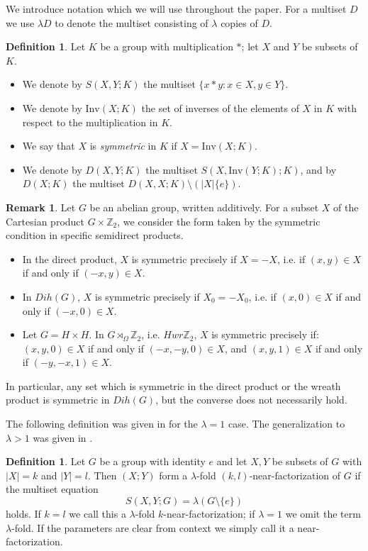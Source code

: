 \documentclass[12pt, a4paper]{article}
\theoremstyle{definition}
\newtheorem{definition}[theorem]{Definition}
\newtheorem{remark}[theorem]{Remark}
\begin{document}
We introduce notation which we will use throughout the paper. For a multiset $D$ we use $\lambda D$ to denote the multiset consisting of $\lambda$ copies of $D$. 

\begin{definition}\label{def:multi}
Let $K$ be a group with multiplication $*$; let $X$ and $Y$ be subsets of $K$.
\begin{itemize}
\item[(i)]  We denote by $S(X,Y;K)$ the multiset $\{x*y: x \in X, y \in Y\}$. 
\item[(ii)] We denote by $\mathrm{Inv}(X;K)$ the set of inverses of the elements of $X$ in $K$ with respect to the multiplication in $K$.
\item[(iii)] We say that $X$ is \emph{symmetric} in $K$ if $X=\mathrm{Inv}(X;K)$.
\item[(iv)]  We denote by $D(X,Y;K)$ the multiset $S(X,\mathrm{Inv}(Y;K);K)$, and by $D(X; K)$ the multiset $D(X,X;K) \setminus (|X|\{e\})$.
\end{itemize}
\end{definition} 

\begin{remark}\label{rem:symm}
Let $G$ be an abelian group, written additively. For a subset $X$ of the Cartesian product $G \times \mathbb{Z}_2$, we consider the form taken by the symmetric condition in specific semidirect products.
\begin{itemize}
\item In the direct product, $X$ is symmetric precisely if $X=-X$, i.e. if $(x,y) \in X$ if and only if $(-x,y) \in X$.
\item In $Dih(G)$, $X$ is symmetric precisely if $X_0=-X_0$, i.e. if $(x,0) \in X$ if and only if $(-x,0) \in X$.
\item Let $G=H \times H$. In $G \rtimes_{\Omega} \mathbb{Z}_2$, i.e. $H wr \mathbb{Z}_2$, $X$ is symmetric precisely if: $(x,y,0) \in X$ if and only if $(-x,-y,0) \in X$, and $(x,y,1) \in X$ if and only if $(-y,-x,1) \in X$.
\end{itemize}
In particular, any set which is symmetric in the direct product or the wreath product is symmetric in $Dih(G)$, but the converse does not necessarily hold.
\end{remark}


The following definition was given in \cite{Caen, KrePatSti} for the $\lambda=1$ case.  The generalization to $\lambda>1$ was given in \cite{KreLiSti}.

\begin{definition}\label{def:near}
Let $G$ be a group with identity $e$ and let $X,Y$ be subsets of $G$ with $|X|=k$ and $|Y|=l$.  Then $(X;Y)$ form a $\lambda$-fold $(k,l)$-near-factorization of $G$ if the multiset equation
$$ S(X,Y; G)=\lambda(G \setminus \{e\})$$
holds.  If $k=l$ we call this a $\lambda$-fold $k$-near-factorization; if $\lambda=1$ we omit the term $\lambda$-fold. If the parameters are clear from context we simply call it a near-factorization.  
\end{definition}
\end{document}
